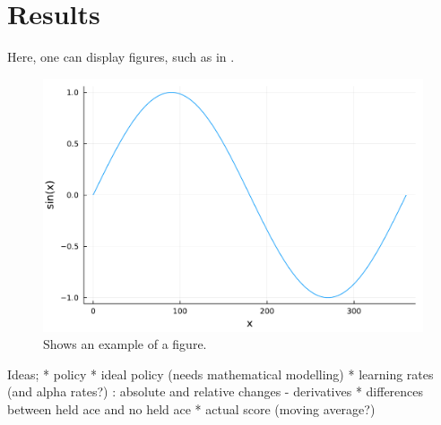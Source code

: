 \section{Results}

Here, one can display figures, such as in .

\begin{figure}
    \centering
    \includegraphics[width=\singlefigure]{figures/example.pdf}
    \caption{\label{fig:example} Shows an example of a figure.}
\end{figure}

Ideas;
* policy
* ideal policy (needs mathematical modelling)
* learning rates (and alpha rates?) : absolute and relative changes - derivatives
* differences between held ace and no held ace
* actual score (moving average?)